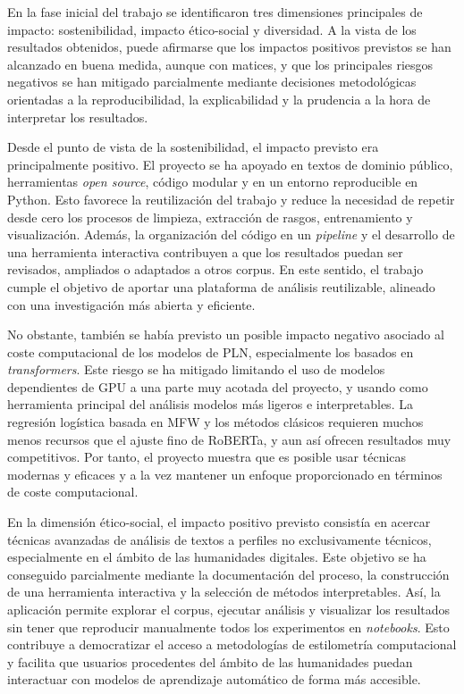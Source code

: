 \documentclass[IB]{TFUOC}%
\begin{document}
En la fase inicial del trabajo se identificaron tres dimensiones principales de impacto: sostenibilidad, impacto ético-social y diversidad. A la vista de los resultados obtenidos, puede afirmarse que los impactos positivos previstos se han alcanzado en buena medida, aunque con matices, y que los principales riesgos negativos se han mitigado parcialmente mediante decisiones metodológicas orientadas a la reproducibilidad, la explicabilidad y la prudencia a la hora de interpretar los resultados.

Desde el punto de vista de la sostenibilidad, el impacto previsto era principalmente positivo. El proyecto se ha apoyado en textos de dominio público, herramientas \textit{open source}, código modular y en un entorno reproducible en Python. Esto favorece la reutilización del trabajo y reduce la necesidad de repetir desde cero los procesos de limpieza, extracción de rasgos, entrenamiento y visualización. Además, la organización del código en un \textit{pipeline} y el desarrollo de una herramienta interactiva contribuyen a que los resultados puedan ser revisados, ampliados o adaptados a otros corpus. En este sentido, el trabajo cumple el objetivo de aportar una plataforma de análisis reutilizable, alineado con una investigación más abierta y eficiente.

No obstante, también se había previsto un posible impacto negativo asociado al coste computacional de los modelos de PLN, especialmente los basados en \textit{transformers}. Este riesgo se ha mitigado limitando el uso de modelos dependientes de GPU a una parte muy acotada del proyecto, y usando como herramienta principal del análisis modelos más ligeros e interpretables. La regresión logística basada en MFW y los métodos clásicos requieren muchos menos recursos que el ajuste fino de RoBERTa, y aun así ofrecen resultados muy competitivos. Por tanto, el proyecto muestra que es posible usar técnicas modernas y eficaces y a la vez mantener un enfoque proporcionado en términos de coste computacional.

En la dimensión ético-social, el impacto positivo previsto consistía en acercar técnicas avanzadas de análisis de textos a perfiles no exclusivamente técnicos, especialmente en el ámbito de las humanidades digitales. Este objetivo se ha conseguido parcialmente mediante la documentación del proceso, la construcción de una herramienta interactiva y la selección de métodos interpretables. Así, la aplicación permite explorar el corpus, ejecutar análisis y visualizar los resultados sin tener que reproducir manualmente todos los experimentos en \textit{notebooks}. Esto contribuye a democratizar el acceso a metodologías de estilometría computacional y facilita que usuarios procedentes del ámbito de las humanidades puedan interactuar con modelos de aprendizaje automático de forma más accesible.
\end{document}
